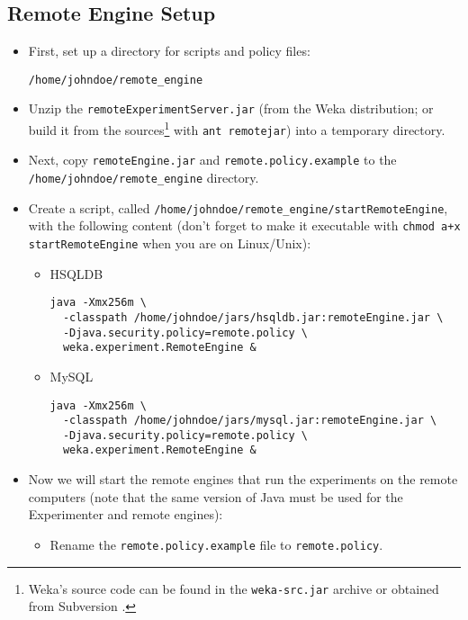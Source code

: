 \subsection{Remote Engine Setup}

\begin{itemize}
   \item First, set up a directory for scripts and policy files: 
		\begin{verbatim}
/home/johndoe/remote_engine
		\end{verbatim}

   \item Unzip the \texttt{remoteExperimentServer.jar} (from the Weka distribution; or build it from the sources\footnote{Weka's source code can be found in the \texttt{weka-src.jar} archive or obtained from Subversion \cite{subversion}.} with \texttt{ant remotejar}) into a temporary directory.

   \item Next, copy \texttt{remoteEngine.jar} and \texttt{remote.policy.example} to the \\ \texttt{/home/johndoe/remote\_engine} directory.

   \item Create a script, called \texttt{/home/johndoe/remote\_engine/startRemoteEngine}, with the following content (don't forget to make it executable with \texttt{chmod a+x startRemoteEngine} when you are on Linux/Unix): 
      \begin{itemize}
      	\item HSQLDB
				\begin{verbatim}
java -Xmx256m \
  -classpath /home/johndoe/jars/hsqldb.jar:remoteEngine.jar \
  -Djava.security.policy=remote.policy \
  weka.experiment.RemoteEngine &
				\end{verbatim}
			
			\item MySQL
				\begin{verbatim}
java -Xmx256m \
  -classpath /home/johndoe/jars/mysql.jar:remoteEngine.jar \
  -Djava.security.policy=remote.policy \
  weka.experiment.RemoteEngine &
				\end{verbatim}
		\end{itemize}

   \item Now we will start the remote engines that run the experiments on the remote computers (note that the same version of Java must be used for the Experimenter and remote engines):
   	\begin{itemize}
         \item Rename the \texttt{remote.policy.example} file to \texttt{remote.policy}.


\end{itemize}
\end{itemize}
